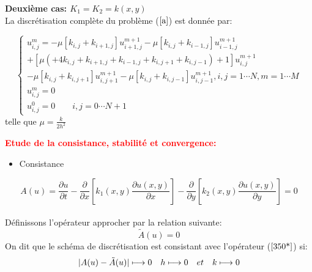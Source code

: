 \documentclass[12pt]{beamer}
\begin{document}
\begin{frame}

		\textbf{Deuxième cas: $K_{1}= K_{2}=k(x,y)$}\\

	
		La discr\'{e}tisation compl\`{e}te du probl\`{e}me ($\ref{a}$) est donn\'{e}e par:
		\begin{block}{}
		\begin{equation}
	\begin{cases}
		u^{m}_{i,j}=-\mu[  k_{i,j}+k_{i+1,j}]u^{m+1}_{i+1,j}-\mu[k_{i,j}+k_{i-1,j}]u^{m+1}_{i-1,j}\\+[\mu(+4k_{i,j}+k_{i+1,j}+k_{i-1,j}+k_{i,j+1}+k_{i,j-1})+1]u^{m+1}_{i,j}
		\\-\mu[  k_{i,j}+k_{i,j+1}]u^{m+1}_{i,j+1}-\mu[ k_{i,j}+k_{i,j-1}]u^{m+1}_{i,j-1}, i,j=1\cdots N, m=1\cdots M\\
		u^{m}_{i,j}=0\qquad \\
		u^{0}_{i,j}=0\qquad i,j=0\cdots N+1
	\label{350**}	\end{cases}
\end{equation}
telle que $\mu=\frac{k}{2h^{2}}$
	\end{block}
\end{frame}
			\begin{frame}
		\textcolor{red}{\textbf{Etude de la consistance, stabilit\'{e} et convergence:}}
		\begin{itemize}
			[triangle]
			\item Consistance
		\end{itemize}
			\begin{block}{}	
				\begin{equation}
			A(u)=\frac{\partial{u}}{\partial{t}}-\frac{\partial}{\partial{x}}\left[ k_{1}(x,y)\frac{\partial{u(x,y)}}{\partial{x}}\right]-\frac{\partial}{\partial{y}}\left[ k_{2}(x,y)\frac{\partial{u(x,y)}}{\partial{y}}\right]=0\label{350*}\end{equation}\\
			D\'{e}finissons l'op\'{e}rateur approcher par la relation suivante:\\
			\begin{equation}
			\tilde{A}(u)=0 
			\end{equation}
			On dit que le sch\'{e}ma de discr\'{e}tisation est consistant avec l'op\'{e}rateur ($\ref{350*}$) si:
			\begin{equation}
			\arrowvert{A(u)-\tilde{A}(u)}\rvert \longmapsto 0 \quad h\longmapsto 0 \quad et \quad k\longmapsto 0
			\end{equation}
			\end{block}
		
	\end{frame}
\end{document}
